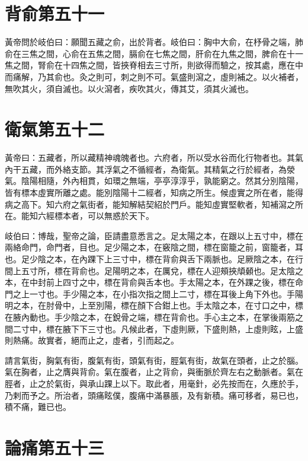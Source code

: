 \section{背俞第五十一}

黃帝問於岐伯曰：願聞五藏之俞，出於背者。岐伯曰：胸中大俞，在杼骨之端，肺俞在三焦之間，心俞在五焦之間，膈俞在七焦之間，肝俞在九焦之間，脾俞在十一焦之間，腎俞在十四焦之間，皆挾脊相去三寸所，則欲得而驗之，按其處，應在中而痛解，乃其俞也。灸之則可，刺之則不可。氣盛則瀉之，虛則補之。以火補者，無吹其火，須自滅也。以火瀉者，疾吹其火，傳其艾，須其火滅也。



\section{衛氣第五十二}

黃帝曰：五藏者，所以藏精神魂魄者也。六府者，所以受水谷而化行物者也。其氣內干五藏，而外絡支節。其浮氣之不循經者，為衛氣。其精氣之行於經者，為滎氣。陰陽相隨，外內相貫，如環之無端，亭亭淳淳乎，孰能窮之。然其分別陰陽，皆有標本虛實所離之處。能別陰陽十二經者，知病之所生。候虛實之所在者，能得病之高下。知六府之氣街者，能知解結契紹於門戶。能知虛實堅軟者，知補瀉之所在。能知六經標本者，可以無惑於天下。

岐伯曰：博哉，聖帝之論，臣請盡意悉言之。足太陽之本，在跟以上五寸中，標在兩絡命門，命門者，目也。足少陽之本，在竅陰之間，標在窗籠之前，窗籠者，耳也。足少陰之本，在內踝下上三寸中，標在背俞與舌下兩脈也。足厥陰之本，在行間上五寸所，標在背俞也。足陽明之本，在厲兌，標在人迎頰挾頏顙也。足太陰之本，在中封前上四寸之中，標在背俞與舌本也。手太陽之本，在外踝之後，標在命門之上一寸也。手少陽之本，在小指次指之間上二寸，標在耳後上角下外也。手陽明之本，在肘骨中，上至別陽，標在顏下合鉗上也。手太陰之本，在寸口之中，標在腋內動也。手少陰之本，在銳骨之端，標在背俞也。手心主之本，在掌後兩筋之間二寸中，標在腋下下三寸也。凡候此者，下虛則厥，下盛則熱，上虛則眩，上盛則熱痛。故實者，絕而止之，虛者，引而起之。

請言氣街，胸氣有街，腹氣有街，頭氣有街，脛氣有街，故氣在頭者，止之於腦。氣在胸者，止之膺與背俞。氣在腹者，止之背俞，與衝脈於齊左右之動脈者。氣在脛者，止之於氣街，與承山踝上以下。取此者，用毫針，必先按而在，久應於手，乃剌而予之。所治者，頭痛眩僕，腹痛中滿暴脹，及有新積。痛可移者，易已也，積不痛，難已也。



\section{論痛第五十三}

